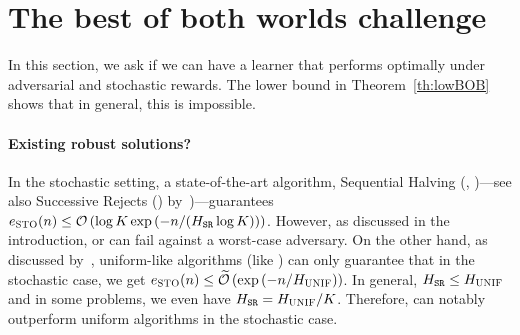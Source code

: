 %
\section{The best of both worlds challenge}
\label{s:FormuBOB}
%
In this section, we ask if we can have a learner 
that performs optimally under adversarial and stochastic rewards. 
The lower bound in Theorem~\ref{th:lowBOB} shows that in general,
this is impossible.\vspace{.2cm}


%
\paragraph{Existing robust solutions?} In the stochastic setting,
a state-of-the-art algorithm, Sequential Halving (\SH{}, 
\citealp{Karnin13AO})---see also Successive Rejects (\SR{}) 
by~\cite{Audibert10BA})---guarantees 
$e_{\textsc{STO}}(n) \leq \mathcal{O}\left(\log K\exp
\left(-n/(H_{{\normalfont \texttt{SR}}}\log K)\right)\right)$. 
However, as discussed in the introduction, \SR{} or \SH{} can fail  
against a worst-case adversary.
On the other hand, as discussed by~\cite{Audibert10BA},  
uniform-like algorithms (like \RULE{}) can only guarantee that
in the stochastic case, we get $e_{\textsc{STO}}(n) \leq  
\widetilde{\mathcal{O}}\left(\exp\left(-n/H_{{\normalfont \textsc{UNIF}}}\right)\right)$.
In general, $H_{{\normalfont \texttt{SR}}}\leq H_{{\normalfont \textsc{UNIF}}}$ and 
in some problems, we even have $H_{{\normalfont \texttt{SR}}}=H_{{\normalfont \textsc{UNIF}}}/K$. 
Therefore, \SH{} can notably outperform uniform 
algorithms in the stochastic case.%


%
